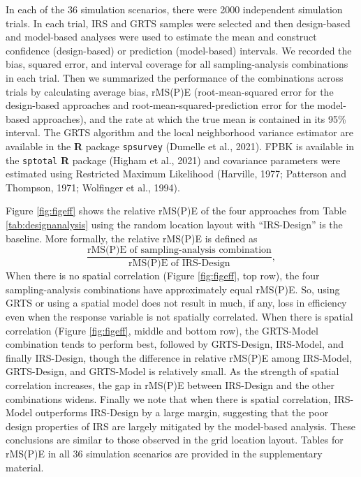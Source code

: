 \documentclass[]{elsarticle} %
\begin{document}
In each of the 36 simulation scenarios, there were 2000 independent
simulation trials. In each trial, IRS and GRTS samples were selected and
then design-based and model-based analyses were used to estimate the
mean and construct confidence (design-based) or prediction (model-based)
intervals. We recorded the bias, squared error, and interval coverage
for all sampling-analysis combinations in each trial. Then we summarized
the performance of the combinations across trials by calculating average
bias, rMS(P)E (root-mean-squared error for the design-based approaches
and root-mean-squared-prediction error for the model-based approaches),
and the rate at which the true mean is contained in its 95\% interval.
The GRTS algorithm and the local neighborhood variance estimator are
available in the \textbf{\textsf{R}} package \texttt{spsurvey} (Dumelle
et al., 2021). FPBK is available in the \texttt{sptotal}
\textbf{\textsf{R}} package (Higham et al., 2021) and covariance
parameters were estimated using Restricted Maximum Likelihood (Harville,
1977; Patterson and Thompson, 1971; Wolfinger et al., 1994).

Figure \ref{fig:figeff} shows the relative rMS(P)E of the four
approaches from Table \ref{tab:designanalysis} using the random location
layout with ``IRS-Design'' is the baseline. More formally, the relative
rMS(P)E is defined as \begin{equation*}
\frac{\text{rMS(P)E of sampling-analysis combination}}{\text{rMS(P)E of IRS-Design}},
\end{equation*} When there is no spatial correlation (Figure
\ref{fig:figeff}, top row), the four sampling-analysis combinations have
approximately equal rMS(P)E. So, using GRTS or using a spatial model
does not result in much, if any, loss in efficiency even when the
response variable is not spatially correlated. When there is spatial
correlation (Figure \ref{fig:figeff}, middle and bottom row), the
GRTS-Model combination tends to perform best, followed by GRTS-Design,
IRS-Model, and finally IRS-Design, though the difference in relative
rMS(P)E among IRS-Model, GRTS-Design, and GRTS-Model is relatively
small. As the strength of spatial correlation increases, the gap in
rMS(P)E between IRS-Design and the other combinations widens. Finally we
note that when there is spatial correlation, IRS-Model outperforms
IRS-Design by a large margin, suggesting that the poor design properties
of IRS are largely mitigated by the model-based analysis. These
conclusions are similar to those observed in the grid location layout.
Tables for rMS(P)E in all 36 simulation scenarios are provided in the
supplementary material.
\end{document}
